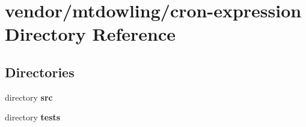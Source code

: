 \section{vendor/mtdowling/cron-\/expression Directory Reference}
\label{dir_7aa94719fadb531d7336ac392cd2df12}
\subsection*{Directories}
\begin{DoxyCompactItemize}
\item 
directory {\bf src}
\item 
directory {\bf tests}
\end{DoxyCompactItemize}
